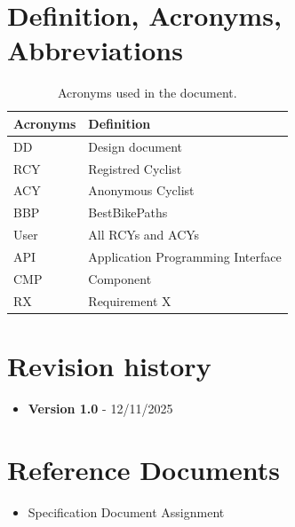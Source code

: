 \section{Definition, Acronyms, Abbreviations}
\label{sec:definition_acronyms_abbreviations}%
\begin{table}[H]
    \begin{center}
        \begin{tabular}{ |l|l| }
            \hline
            \textbf{Acronyms} & \textbf{Definition}                              \\
            \hline
            DD             & Design document                     \\
            \hline
            RCY             & Registred Cyclist                         \\
            \hline
            ACY              & Anonymous Cyclist                         \\
            \hline
            BBP             & BestBikePaths                   \\
            \hline
            User            & All RCYs and ACYs                           \\
            \hline
            API             & Application Programming Interface                           \\
            \hline
            CMP             & Component                          \\
            \hline
            RX              & Requirement X                           \\
            \hline
         \end{tabular}
        \caption{Acronyms used in the document.}
        \label{tab:acronyms}%
    \end{center}
\end{table}




\section{Revision history}
\label{sec:revision_history}%
\begin{itemize}
    \item \textbf{Version 1.0} - 12/11/2025
\end{itemize}


\section{Reference Documents}
\label{sec:reference_documents}%
\begin{itemize}
    \item Specification Document Assignment
\end{itemize}

